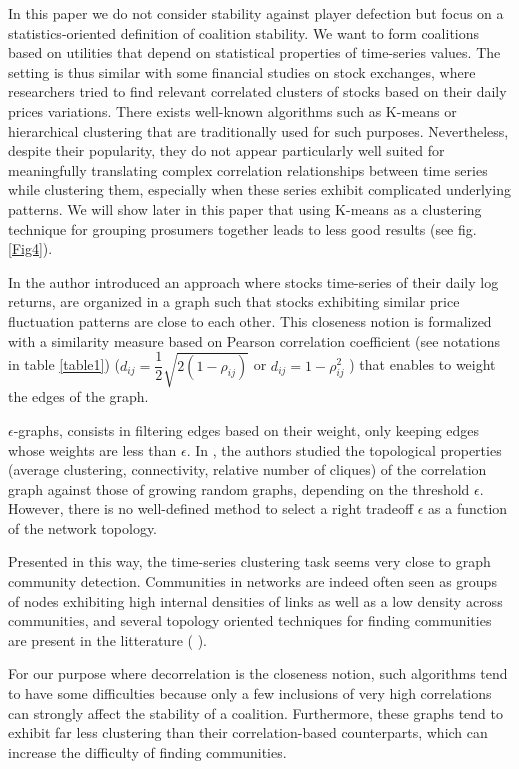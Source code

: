 \documentclass[conference]{IEEEtran}
\begin{document}
In this paper we do not consider stability against player defection but focus on a statistics-oriented definition of coalition stability. We want to form coalitions based on utilities that depend on statistical properties of time-series values. The setting is thus similar with some financial studies on stock exchanges, where researchers tried to find relevant correlated clusters of stocks based on their daily prices variations. There exists well-known algorithms such as K-means or hierarchical clustering that are traditionally used for such purposes. Nevertheless, despite their popularity, they do not appear particularly well suited for meaningfully translating complex correlation relationships between time series while clustering them, especially when these series exhibit complicated underlying patterns. We will show later in this paper that using K-means as a clustering technique for grouping prosumers together leads to less good results (see fig. \ref{Fig4}). 

In \cite{Mantegna1999} the author introduced an approach where stocks time-series of their daily log returns, are organized in a graph such that stocks exhibiting similar price fluctuation patterns are close to each other. This closeness notion is formalized with a similarity measure based on Pearson correlation coefficient (see notations in table \ref{table1}) ($ d_{ij} = \dfrac{1}{2}\sqrt{2(1-\rho_{ij})} $ or $ d_{ij} = 1 - \rho_{ij}^{2} $ ) that enables to weight the edges of the graph. 

$\epsilon$-graphs, consists in filtering edges based on their weight, only keeping edges whose weights are less than $ \epsilon $. In \cite{Garas2008, Onnela2004}, the authors studied the topological properties (average clustering, connectivity, relative number of cliques) of the correlation graph against those of growing random graphs, depending on the threshold $ \epsilon $. However, there is no well-defined method to select a right tradeoff $ \epsilon $ as a function of the network topology.

Presented in this way, the time-series clustering task seems very close to graph community detection. Communities in networks are indeed often seen as groups of nodes exhibiting high internal densities of links as well as a low density across communities, and several topology oriented techniques for finding communities are present in the litterature (\cite{Newman2013} \cite{Girvan2002} \cite{Newman2013_2}). 

For our purpose where decorrelation is the closeness notion, such algorithms tend to have some difficulties because only a few inclusions of very high correlations can strongly affect the stability of a coalition. Furthermore, these graphs tend to exhibit far less clustering than their correlation-based counterparts, which can increase the difficulty of finding communities. 
\end{document}
